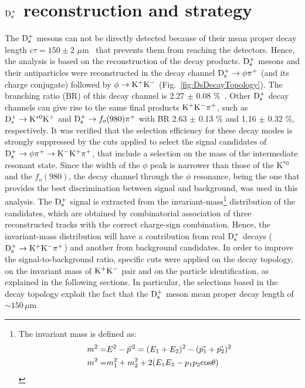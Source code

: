 \section{${\rm D_s^+}$ reconstruction and strategy}
\label{sec:DsRecoStrategy}
The ${\rm D_s^+}$ mesons can not be directly detected because of 
their mean proper decay length $c\tau = 150\pm 2$ $ \mu$m~\cite{Olive:2016xmw} 
that prevents them from reaching the detectors. Hence, the analysis is 
based on the reconstruction of the decay products.
${\rm D_s^+}$ mesons and their antiparticles were 
 reconstructed in the decay channel ${\rm D_s^{+}\to \phi\pi^+}$ 
 (and its charge conjugate) followed by ${\phi \to {\rm K^+ K^-}}$ 
 (Fig.~\ref{fig:DsDecayTopology}). The branching ratio (BR) of this decay channel 
 is 2.27 $\pm$ 0.08 \%~\cite{Olive:2016xmw}.
Other ${\rm D_s^+}$ decay channels can give rise to the same final products
 ${\rm K^+ K^-}\pi^+$, such as ${\rm D_s^+}\rightarrow {\rm  K^{*0} K^+}$ and 
 ${\rm D_s^+}\rightarrow f_o(980) \pi^+$ with BR  2.63 $\pm$ 0.13 \% and 
 1.16 $\pm$ 0.32 \%, respectively. It was verified that the selection efficiency for 
 these decay modes is strongly suppressed by the cuts applied 
 to select the signal candidates of ${\rm D_s^{+}\to \phi\pi^+\to K^-K^+\pi^+}$, that include 
 a selection on the mass of the intermediate resonant state. 
 Since the width of the $\phi$ peak is narrower than those of the 
 K$^{*0}$ and the $f_o(980)$, the decay channel through the 
 $\phi$ resonance, being the one that provides the best discrimination 
 between signal and background, was used in this analysis. 
 The ${\rm D_s^+}$ signal is extracted from 
 the invariant-mass\footnote{The invariant mass is defined as:\\ 
 \begin{align*} m^2 =& E^2 -\vec{p}^{\, 2} = (E_1 + E_2)^2 -(\vec{p_1} + \vec{p_2})^2 \\ m^2 =& m_1^2 +m_2^2 + 2(E_1E_2 -p_1p_2{\rm cos}\theta) \end{align*}} 
 distribution of the candidates, which are obtained by 
 combinatorial association of three reconstructed tracks with the correct 
 charge-sign combination. Hence, 
 the invariant-mass distribution will have a contribution from real 
 ${\rm D_s^+}$ decays (${\rm D^{+}_\mathrm{s}\to K^+ K^-\pi^+}$) and another 
 from background candidates. In order to improve the signal-to-background
ratio, specific cuts were applied on the decay topology, on
   the invariant mass of ${\rm K^+ K^-}$ pair and on the particle identification, 
   as explained in the following sections. 
In particular, the selections based in the decay topology exploit the
fact that the ${\rm D_s^+}$ meson mean proper decay length of $\sim 150\, \mu$m  
